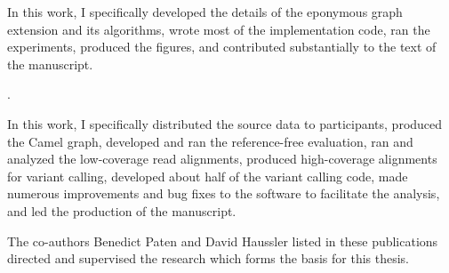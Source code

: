 \begin{frontmatter}
\begin{acknowledgements}
{In this work, I specifically developed the details of the eponymous graph extension and its algorithms, wrote most of the implementation code, ran the experiments, produced the figures, and contributed substantially to the text of the manuscript.

\begin{singlespace}
\noindent
{}.
\end{singlespace}

}

In this work, I specifically distributed the source data to participants, produced the Camel graph, developed and ran the reference-free evaluation, ran and analyzed the low-coverage read alignments, produced high-coverage alignments for variant calling, developed about half of the variant calling code, made numerous improvements and bug fixes to the \vg software to facilitate the analysis, and led the production of the manuscript.

The co-authors Benedict Paten and David Haussler listed in these publications directed and supervised the research which forms the basis for this thesis.
\end{acknowledgements}

\end{frontmatter}
